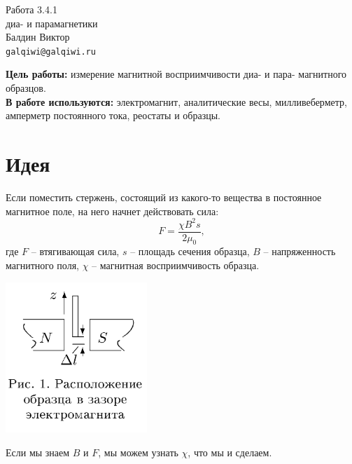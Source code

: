 \documentclass[a4paper,12pt]{article}
\begin{document}
\begin{center}
  \LARGE{Работа 3.4.1}\\[0.2cm]
  \LARGE{диа- и парамагнетики}\\[0.2cm]
  \large{Балдин Виктор}\\[0.2cm]
  \normalsize{\texttt{galqiwi@galqiwi.ru}}
\end{center}

\textbf{Цель работы:} измерение магнитной восприимчивости диа- и пара- магнитного образцов.\\
\textbf{В работе используются:} электромагнит, аналитические весы, милливеберметр, амперметр постоянного тока, реостаты и образцы.\\
\section*{Идея}

Если поместить стержень, состоящий из какого-то вещества в постоянное магнитное поле, на него начнет действовать сила:
$$F = \frac{\chi B^2 s}{2\mu_0},$$
где $F$ -- втягивающая сила, $s$ -- площадь сечения образца, $B$ -- напряженность магнитного поля, $\chi$ -- магнитная восприимчивость образца.

\begin{center}
\includegraphics[width=0.40\textwidth]{1.png}
\end{center}

Если мы знаем $B$ и $F$, мы можем узнать $\chi$, что мы и сделаем.
\end{document}
